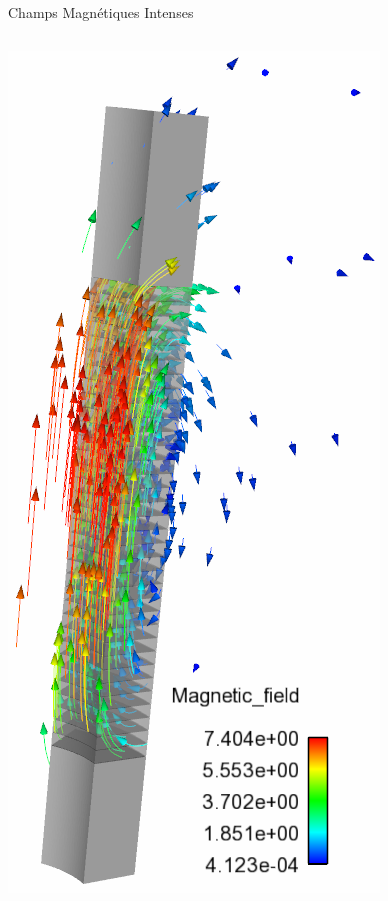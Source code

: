 \begin{frame}{Champs Magnétiques Intenses}
\begin{columns}[c]
    \includegraphics[height=.4\textheight]{Figures/cmi/HR-21-sector_magnetic_field_02.png}
  \end{columns}

\end{frame}

